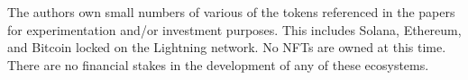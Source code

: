 The authors own small numbers of various of the tokens referenced in the papers for experimentation and/or investment purposes. This includes Solana, Ethereum, and Bitcoin locked on the Lightning network. No NFTs are owned at this time. There are no financial stakes in the development of any of these ecosystems.